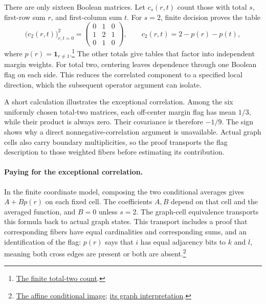 There are only sixteen Boolean matrices. Let $c_s(r,t)$ count those with total $s$, first-row sum $r$, and first-column sum $t$. For $s=2$, finite decision proves the table
\[
 \bigl(c_2(r,t)\bigr)_{r,t=0}^2
   =\begin{pmatrix}0&1&0\\1&2&1\\0&1&0\end{pmatrix},
 \qquad c_2(r,t)=2-p(r)-p(t),
\]
where $p(r)=\mathbf1_{r\ne1}$.\footnote{\href{https://github.com/openai/math/blob/fd4aeeb2ee4fc729c18d98444fed42fd0529eeeb/lean/OAI/Probability/SwitchChain/CrossMatrix.lean\#L22-L25}{The finite total-two count}.}
The other totals give tables that factor into independent margin weights.
For total two, centering leaves dependence through one Boolean flag on
each side. This reduces the correlated component to a specified local
direction, which the subsequent operator argument can isolate.

A short calculation illustrates the exceptional correlation. Among the six
uniformly chosen total-two matrices, each off-center margin flag has mean
$1/3$, while their product is always zero. Their covariance is therefore
$-1/9$. The sign shows why a direct nonnegative-correlation argument is
unavailable. Actual graph cells also carry boundary multiplicities, so the
proof transports the flag description to those weighted fibers before
estimating its contribution.

\paragraph{Paying for the exceptional correlation.}
In the finite coordinate model, composing the two conditional averages
gives $A+Bp(r)$ on each fixed cell. The coefficients $A,B$ depend on
that cell and the averaged function, and $B=0$ unless $s=2$. The graph-cell equivalence transports this formula back to actual graph states. This transport includes a proof that corresponding fibers have equal cardinalities and corresponding sums, and an identification of the flag: $p(r)$ says that $i$ has equal adjacency bits to $k$ and $l$, meaning both cross edges are present or both are absent.\footnote{\href{https://github.com/openai/math/blob/fd4aeeb2ee4fc729c18d98444fed42fd0529eeeb/lean/OAI/Probability/SwitchChain/CrossCellAffineComposition.lean\#L64-L87}{The affine conditional image}; \href{https://github.com/openai/math/blob/fd4aeeb2ee4fc729c18d98444fed42fd0529eeeb/lean/OAI/Probability/SwitchChain/DisjointGraphAffine.lean\#L68-L90}{its graph interpretation}.}

